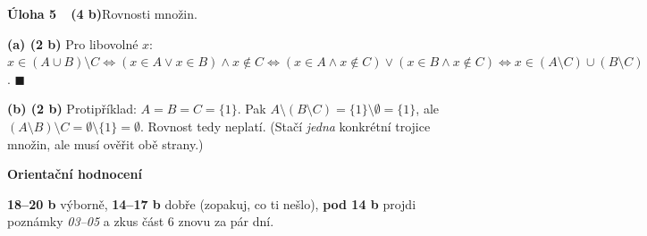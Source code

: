 \documentclass[11pt,a4paper]{article}
\newcommand{\zad}[2]{\par\Needspace*{4cm}\vspace{1.1em}\noindent\textcolor{accent}{\sffamily\bfseries #1}\enspace #2\par}
\begin{document}
\zad{Úloha 5\ \ (4 b)}{Rovnosti množin.}
\begin{reseni}
\textbf{(a) (2 b)} Pro libovolné $x$:
$x\in(A\cup B)\setminus C\Leftrightarrow(x\in A\lor x\in B)\land x\notin C\Leftrightarrow(x\in A\land x\notin C)\lor(x\in B\land x\notin C)\Leftrightarrow x\in(A\setminus C)\cup(B\setminus C)$. \hfill$\blacksquare$

\textbf{(b) (2 b)} Protipříklad: $A=B=C=\{1\}$. Pak $A\setminus(B\setminus C)=\{1\}\setminus\emptyset=\{1\}$, ale $(A\setminus B)\setminus C=\emptyset\setminus\{1\}=\emptyset$. Rovnost tedy neplatí. (Stačí \emph{jedna} konkrétní trojice množin, ale musí ověřit obě strany.)
\end{reseni}

\vspace{1.2em}
\begin{tip}
{\sffamily\bfseries\small Orientační hodnocení}\par\vspace{2pt}
\textbf{18–20 b} výborně, \textbf{14–17 b} dobře (zopakuj, co ti nešlo), \textbf{pod 14 b} projdi poznámky \textit{03–05} a zkus část 6 znovu za pár dní.
\end{tip}
\end{document}
